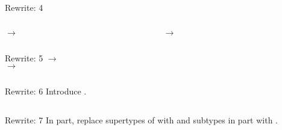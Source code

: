 \begin{frame}{Rewrite: 4}
  \begin{columns}
    \begin{column}{0.5\textwidth}
       $\to$ 
      
      \usebox\typecaseDbox
    \end{column}
    \begin{column}{0.5\textwidth}  %
       $\to$ 

      \usebox\typecaseEbox
    \end{column}    
  \end{columns}
\end{frame}

\begin{frame}{Rewrite: 5}
   $\to$ \\
   $\to$ 

  \begin{columns}
    \begin{column}{0.5\textwidth}
      \usebox\typecaseEbox
    \end{column}
    \begin{column}{0.5\textwidth}  %
      \usebox\typecaseFbox
    \end{column}    
  \end{columns}
\end{frame}

\begin{frame}{Rewrite: 6}
  Introduce .

  \begin{columns}
    \begin{column}{0.5\textwidth}
      \usebox\typecaseFbox
    \end{column}
    \begin{column}{0.5\textwidth}  %
      \usebox\typecaseGbox
    \end{column}    
  \end{columns}
\end{frame}

\begin{frame}{Rewrite: 7}
  In  part, replace supertypes of  with  and subtypes in  part with .

  \begin{columns}
    \begin{column}{0.5\textwidth}
      \usebox\typecaseGbox
    \end{column}
    \begin{column}{0.5\textwidth}  %
      \usebox\typecaseHbox
    \end{column}    
  \end{columns}
\end{frame}


